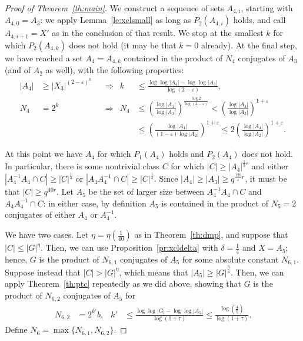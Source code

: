 \documentclass[a4paper]{article}
\theoremstyle{definition}
\numberwithin{equation}{section}
\begin{document}
\begin{proof}[Proof of Theorem~\ref{th:main}]
We construct a sequence of sets $A_{4,i}$, starting with $A_{4,0}=A_{3}$: we apply Lemma~\ref{le:xclsmall} as long as $P_{2}(A_{4,i})$ holds, and call $A_{4,i+1}=X'$ as in the conclusion of that result. We stop at the smallest $k$ for which $P_{2}(A_{4,k})$ does not hold (it may be that $k=0$ already). At the final step, we have reached a set $A_{4}=A_{4,k}$ contained in the product of $N_{4}$ conjugates of $A_{3}$ (and of $A_{2}$ as well), with the following properties:
\begin{align*}
|A_{4}| & \geq|X_{3}|^{(2-\varepsilon)^{k}} & & \Longrightarrow & k & \leq\frac{\log\log|A_{4}|-\log\log|A_{3}|}{\log(2-\varepsilon)}, \\
N_{4} & =2^{k} & & \Longrightarrow & N_{4} & \leq\left(\frac{\log|A_{4}|}{\log|A_{3}|}\right)^{\frac{\log 2}{\log(2-\varepsilon)}}<\left(\frac{\log|A_{4}|}{\log|A_{3}|}\right)^{1+\varepsilon} \\
& & & & & \leq \left(\frac{\log|A_{4}|}{(1-\varepsilon)\log|A_{2}|}\right)^{1+\varepsilon}\leq 2\left(\frac{\log|A_{4}|}{\log|A_{2}|}\right)^{1+\varepsilon}.
\end{align*}

At this point we have $A_{4}$ for which $P_{1}(A_{4})$ holds and $P_{2}(A_{4})$ does not hold. In particular, there is some nontrivial class $C$ for which $|C|\geq|A_{4}|^{\frac{1}{3}\varepsilon}$ and either $|A_{4}^{-1}A_{4}\cap C|\geq|C|^{\frac{1}{4}}$ or $|A_{4}A_{4}^{-1}\cap C|\geq|C|^{\frac{1}{4}}$. Since $|A_{4}|\geq|A_{3}|\geq q^{\frac{120}{\varepsilon}r}$, it must be that $|C|\geq q^{40r}$. Let $A_{5}$ be the set of larger size between $A_{4}^{-1}A_{4}\cap C$ and $A_{4}A_{4}^{-1}\cap C$: in either case, by definition $A_{5}$ is contained in the product of $N_{5}=2$ conjugates of either $A_{4}$ or $A_{4}^{-1}$.

We have two cases. Let $\eta=\eta\left(\frac{1}{40}\right)$ as in Theorem~\ref{th:dmp}, and suppose that $|C|\leq|G|^{\eta}$. Then, we can use Proposition~\ref{pr:xcldelta} with $\delta=\frac{1}{4}$ and $X=A_{5}$; hence, $G$ is the product of $N_{6,1}$ conjugates of $A_{5}$ for some absolute constant $N_{6,1}$. Suppose instead that $|C|>|G|^{\eta}$, which means that $|A_{5}|\geq|G|^{\frac{\eta}{4}}$. Then, we can apply Theorem~\ref{th:ptc} repeatedly as we did above, showing that $G$ is the product of $N_{6,2}$ conjugates of $A_{5}$ for
\begin{align*}
N_{6,2} & =2^{k'}b, & k' & \leq\frac{\log\log|G|-\log\log|A_{5}|}{\log(1+\tau)}\leq\frac{\log\left(\frac{4}{\eta}\right)}{\log(1+\tau)}.
\end{align*}
Define $N_{6}=\max\{N_{6,1},N_{6,2}\}$.


\end{proof}
\end{document}
